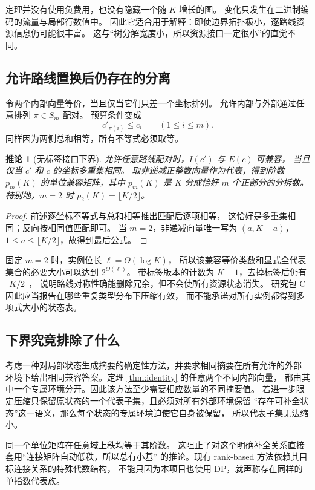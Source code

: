 \documentclass[UTF8,a4paper,11pt,fontset=fandol]{ctexart}
\newtheorem{corollary}[theorem]{推论}
\theoremstyle{definition}
\begin{document}
定理并没有使用负费用，也没有隐藏一个随 $K$ 增长的图。
变化只发生在二进制编码的流量与局部行数值中。
因此它适合用于解释：即使边界拓扑极小，逐路线资源信息仍可能很丰富。
这与“树分解宽度小，所以资源接口一定很小”的直觉不同。

\subsection{允许路线置换后仍存在的分离}

令两个内部向量等价，当且仅当它们只差一个坐标排列。
允许内部与外部通过任意排列 $\pi\in S_m$ 配对。
预算条件变成
\[
c'_{\pi(i)}\le c_i\qquad(1\le i\le m).
\]
同样因为两侧总和相等，所有不等式必须取等。

\begin{corollary}[无标签接口下界]\label{cor:unlabelled}
允许任意路线配对时，$I(c')$ 与 $E(c)$ 可兼容，
当且仅当 $c'$ 和 $c$ 的坐标多重集相同。
取非递减正整数向量作为代表，得到阶数
$p_m(K)$ 的单位兼容矩阵，其中 $p_m(K)$ 是 $K$ 分成恰好 $m$ 个正部分的分拆数。
特别地，$m=2$ 时 $p_2(K)=\lfloor K/2\rfloor$。
\end{corollary}
\begin{proof}
前述逐坐标不等式与总和相等推出匹配后逐项相等，
这恰好是多重集相同；反向按相同值匹配即可。
当 $m=2$，非递减向量唯一写为 $(a,K-a)$，
$1\le a\le\lfloor K/2\rfloor$，故得到最后公式。
\end{proof}

固定 $m=2$ 时，实例位长 $\ell=\Theta(\log K)$，
所以该兼容等价类数和显式全代表集合的必要大小可以达到 $2^{\Theta(\ell)}$。
带标签版本的计数为 $K-1$，去掉标签后仍有 $\lfloor K/2\rfloor$，
说明路线对称性确能删除冗余，但不会使所有资源状态消失。
研究包 C 因此应当报告在哪些重复类型分布下压缩有效，
而不能承诺对所有实例都得到多项式大小的状态表。

\subsection{下界究竟排除了什么}

考虑一种对局部状态生成摘要的确定性方法，并要求相同摘要在所有允许的外部
环境下给出相同兼容答案。定理 \ref{thm:identity} 的任意两个不同内部向量，
都由其中一个专属环境分开。因此该方法至少需要相应数量的不同摘要值。
若进一步限定压缩只保留原状态的一个代表子集，且必须对所有外部环境保留
“存在可补全状态”这一语义，那么每个状态的专属环境迫使它自身被保留，
所以代表子集无法缩小。

同一个单位矩阵在任意域上秩均等于其阶数。
这阻止了对这个明确补全关系直接套用“连接矩阵自动低秩，所以总有小基”
的推论。现有 rank-based 方法依赖其目标连接关系的特殊代数结构，
不能只因为本项目也使用 DP，就声称存在同样的单指数代表族。
\end{document}
